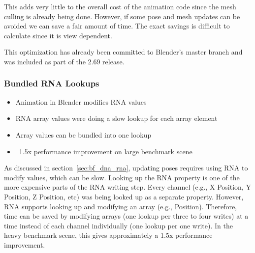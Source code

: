 
This adds very little to the overall cost of the animation code since the mesh culling is already being done.
However, if some pose and mesh updates can be avoided we can save a fair amount of time.
The exact savings is difficult to calculate since it is view dependent.

This optimization has already been committed to Blender's master branch and was included as part of the 2.69 release.

\subsubsection{Bundled RNA Lookups}
\ifsummaries
\begin{itemize}
 \item Animation in Blender modifies RNA values
 \item RNA array values were doing a slow lookup for each array element
 \item Array values can be bundled into one lookup
 \item ~1.5x performance improvement on large benchmark scene
\end{itemize}
\fi

As discussed in section~\ref{sec:bf_dna_rna}, updating poses requires using RNA to modify values, which can be slow.
Looking up the RNA property is one of the more expensive parts of the RNA writing step.
Every channel (e.g., X Position, Y Position, Z Position, etc) was being looked up as a separate property.
However, RNA supports looking up and modifying an array (e.g., Position).
Therefore, time can be saved by modifying arrays (one lookup per three to four writes) at a time instead of each channel individually (one lookup per one write).
In the heavy benchmark scene, this gives approximately a 1.5x performance improvement.

